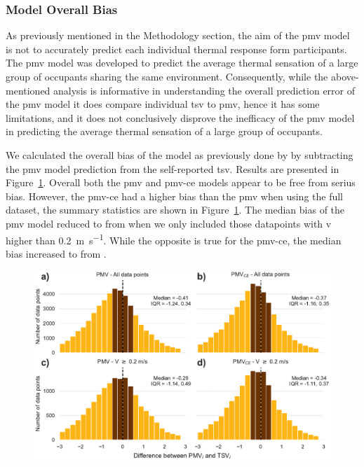 \subsubsection{Model Overall Bias}\label{subsec:model-overall-bias}
As previously mentioned in the Methodology section, the aim of the \ac{pmv} model is not to accurately predict each individual thermal response form participants.
The \ac{pmv} model was developed to predict the average thermal sensation of a large group of occupants sharing the same environment.
Consequently, while the above-mentioned analysis is informative in understanding the overall prediction error of the \ac{pmv} model it does compare individual \ac{tsv} to \ac{pmv}, hence it has some limitations, and it does not conclusively disprove the inefficacy of the \ac{pmv} model in predicting the average thermal sensation of a large group of occupants.

We calculated the overall bias of the model as previously done by  by subtracting the \ac{pmv} model prediction from the self-reported \ac{tsv}.
Results are presented in Figure~\ref{fig:hist_discrepancies}.
Overall both the \ac{pmv} and \gls{pmv-ce} models appear to be free from serius bias.
However, the \gls{pmv-ce} had a higher bias than the \ac{pmv} when using the full dataset, the summary statistics are shown in Figure~\ref{fig:hist_discrepancies}.
The median bias of the \ac{pmv} model reduced to  from  when we only included those datapoints with \ac{v} higher than \qty{0.2}{\m\per\s}.
While the opposite is true for the \gls{pmv-ce}, the median bias increased to  from .

\begin{figure}[htb!]
    \centering
    \includegraphics[width=\textwidth]{figures/hist_discrepancies}
    \caption{}
    \label{fig:hist_discrepancies}
\end{figure}


